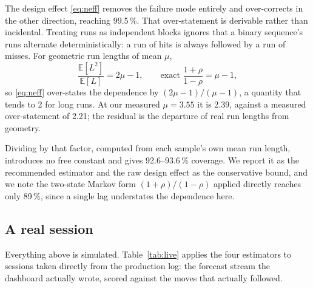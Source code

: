 \documentclass[conference]{IEEEtran}
\begin{document}
The design effect \eqref{eq:neff} removes the failure mode entirely and
over-corrects in the other direction, reaching 99.5\,\%. That over-statement is
derivable rather than incidental. Treating runs as independent blocks ignores
that a binary sequence's runs alternate deterministically: a run of hits is
always followed by a run of misses. For geometric run lengths of mean $\mu$,
\begin{equation}
\frac{\mathbb{E}[L^2]}{\mathbb{E}[L]} = 2\mu - 1,
\qquad
\text{exact } \frac{1+\rho}{1-\rho} = \mu - 1,
\label{eq:alt}
\end{equation}
so \eqref{eq:neff} over-states the dependence by $(2\mu-1)/(\mu-1)$, a quantity
that tends to 2 for long runs. At our measured $\mu = 3.55$ it is 2.39, against
a measured over-statement of 2.21; the residual is the departure of real run
lengths from geometry.

Dividing by that factor, computed from each sample's own mean run length,
introduces no free constant and gives 92.6--93.6\,\% coverage. We report it as
the recommended estimator and the raw design effect as the conservative bound,
and we note the two-state Markov form $(1+\rho)/(1-\rho)$ applied directly
reaches only 89\,\%, since a single lag understates the dependence here.


\subsection{A real session}

Everything above is simulated. Table~\ref{tab:live} applies the four estimators
to sessions taken directly from the production log: the forecast stream the
dashboard actually wrote, scored against the moves that actually followed.
\end{document}

